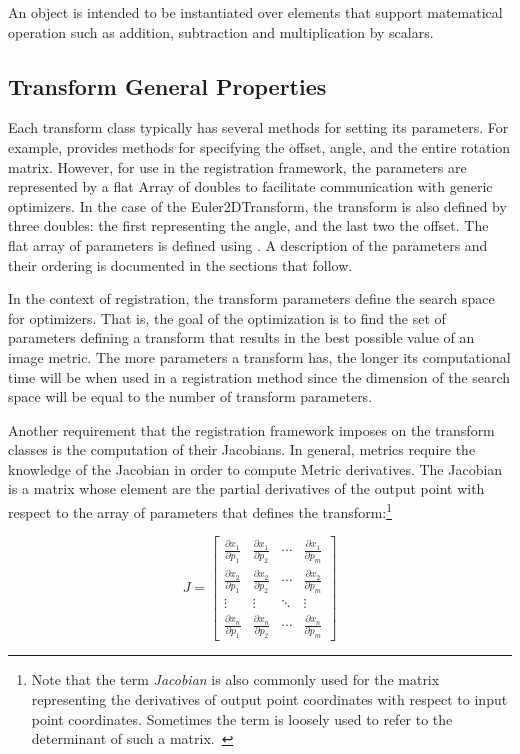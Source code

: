 An  object is intended to be instantiated over elements that
support matematical operation such as addition, subtraction and multiplication
by scalars.


\subsection{Transform General Properties}
\label{sec:TransformGeneralProperties}

 Each transform class typically has
several methods for setting its parameters.  For example,
 provides methods for specifying the offset,
angle, and the entire rotation matrix.  However, for use in the
registration framework, the parameters are represented by a flat
Array of doubles to facilitate communication with generic
optimizers. In the case of the Euler2DTransform, the transform is also
defined by three doubles: the first representing the angle, and the last two the
offset. The flat array of parameters is defined using . A
description of the parameters and their ordering is documented in the 
sections that follow.
 
In the context of registration, the transform parameters define the search
space for optimizers. That is, the goal of the optimization is to find the set
of parameters defining a transform that results in the best possible value of
an image metric. The more parameters a transform has, the longer its
computational time will be when used in a registration method since the
dimension of the search space will be equal to the number of transform
parameters.


Another requirement that the registration framework imposes on the transform
classes is the computation of their Jacobians. In general, metrics require
the knowledge of the Jacobian in order to compute Metric derivatives.
The Jacobian is a matrix whose element are the partial derivatives of the
output point with respect to the array of parameters that defines the
transform:\footnote{Note that the term \emph{Jacobian} is also commonly used
for the matrix representing the derivatives of output point coordinates with
respect to input point coordinates. Sometimes the term is loosely used to
refer to the determinant of such a matrix.~\cite{Dodson1997}}

\begin{equation}
J=\left[ \begin{array}{cccc}
\frac{\partial x_{1}}{\partial p_{1}} & 
\frac{\partial x_{1}}{\partial p_{2}} & 
\cdots  & \frac{\partial x_{1}}{\partial p_{m}}\\
\frac{\partial x_{2}}{\partial p_{1}} & 
\frac{\partial x_{2}}{\partial p_{2}} & 
\cdots  & \frac{\partial x_{2}}{\partial p_{m}}\\
\vdots  & \vdots  & \ddots  & \vdots \\
\frac{\partial x_{n}}{\partial p_{1}} & 
\frac{\partial x_{n}}{\partial p_{2}} & 
\cdots  & \frac{\partial x_{n}}{\partial p_{m}}
\end{array}\right]
\end{equation}

